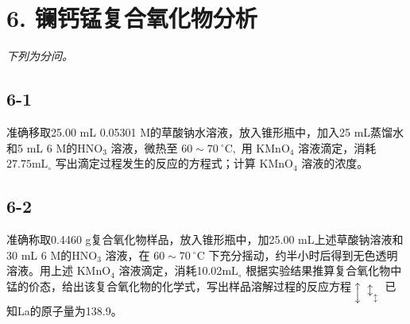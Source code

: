 \section*{6. 镧钙锰复合氧化物分析}
\textit{下列为分问。}

\subsection*{6-1}
准确移取25.00 mL 0.05301 M的草酸钠⽔溶液，放⼊锥形瓶中，加⼊25 mL蒸馏⽔和5 mL 6 M的$\mathrm { H N O _ { 3 } }$ 溶液，微热⾄ $6 0 { \sim } 7 0 \ ^ { \circ } \mathrm { C } ,$ ⽤ $\mathrm { K M n O } _ { 4 }$ 溶液滴定，消耗 $2 7 . 7 5 \mathrm { m L } _ { \circ }$ 写出滴定过程发⽣的反应的⽅程式；计算 $\mathrm { K M n O } _ { 4 }$ 溶液的浓度。

\subsection*{6-2}
准确称取0.4460 g复合氧化物样品，放⼊锥形瓶中，加25.00 mL上述草酸钠溶液和30 mL 6 M的$\mathrm { H N O _ { 3 } }$ 溶液，在 $6 0 { \sim } 7 0 ~ ^ { \circ } \mathrm { C }$ 下充分摇动，约半⼩时后得到⽆⾊透明溶液。⽤上述 $\mathrm { K M n O } _ { 4 }$ 溶液滴定，消耗10.02$\mathrm { m L } _ { \circ }$ 根据实验结果推算复合氧化物中锰的价态，给出该复合氧化物的化学式，写出样品溶解过程的反应⽅程$\updownarrow \updownarrow _ { \updownarrow }$ 已知La的原⼦量为138.9。
